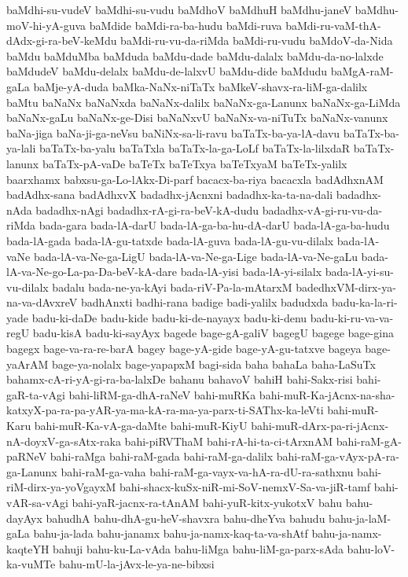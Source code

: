 {baMdhi-su-vudeV
baMdhi-su-vudu
baMdhoV
baMdhuH
baMdhu-janeV
baMdhu-moV-hi-yA-guva
baMdide
baMdi-ra-ba-hudu
baMdi-ruva
baMdi-ru-vaM-thA-dAdx-gi-ra-beV-keMdu
baMdi-ru-vu-da-riMda
baMdi-ru-vudu
baMdoV-da-Nida
baMdu
baMduMba
baMduda
baMdu-dade
baMdu-dalalx
baMdu-da-no-lalxde
baMdudeV
baMdu-delalx
baMdu-de-lalxvU
baMdu-dide
baMdudu
baMgA-raM-gaLa
baMje-yA-duda
baMka-NaNx-niTaTx
baMkeV-shavx-ra-liM-ga-dalilx
baMtu
baNaNx
baNaNxda
baNaNx-dalilx
baNaNx-ga-Lanunx
baNaNx-ga-LiMda
baNaNx-gaLu
baNaNx-ge-Disi
baNaNxvU
baNaNx-va-niTuTx
baNaNx-vanunx
baNa-jiga
baNa-ji-ga-neVsu
baNiNx-sa-li-ravu
baTaTx-ba-ya-lA-davu
baTaTx-ba-ya-lali
baTaTx-ba-yalu
baTaTxla
baTaTx-la-ga-LoLf
baTaTx-la-lilxdaR
baTaTx-lanunx
baTaTx-pA-vaDe
baTeTx
baTeTxya
baTeTxyaM
baTeTx-yalilx
baarxhamx
babxsu-ga-Lo-lAkx-Di-parf
bacacx-ba-riya
bacacxla
badAdhxnAM
badAdhx-sana
badAdhxvX
badadhx-jAcnxni
badadhx-ka-ta-na-dali
badadhx-nAda
badadhx-nAgi
badadhx-rA-gi-ra-beV-kA-dudu
badadhx-vA-gi-ru-vu-da-riMda
bada-gara
bada-lA-darU
bada-lA-ga-ba-hu-dA-darU
bada-lA-ga-ba-hudu
bada-lA-gada
bada-lA-gu-tatxde
bada-lA-guva
bada-lA-gu-vu-dilalx
bada-lA-vaNe
bada-lA-va-Ne-ga-LigU
bada-lA-va-Ne-ga-Lige
bada-lA-va-Ne-gaLu
bada-lA-va-Ne-go-La-pa-Da-beV-kA-dare
bada-lA-yisi
bada-lA-yi-silalx
bada-lA-yi-su-vu-dilalx
badalu
bada-ne-ya-kAyi
bada-riV-Pa-la-mAtarxM
badedhxVM-dirx-ya-na-va-dAvxreV
badhAnxti
badhi-rana
badige
badi-yalilx
badudxda
badu-ka-la-ri-yade
badu-ki-daDe
badu-kide
badu-ki-de-nayayx
badu-ki-denu
badu-ki-ru-va-va-regU
badu-kisA
badu-ki-sayAyx
bagede
bage-gA-galiV
bagegU
bagege
bage-gina
bagegx
bage-va-ra-re-barA
bagey
bage-yA-gide
bage-yA-gu-tatxve
bageya
bage-yaArAM
bage-ya-nolalx
bage-yapapxM
bagi-sida
baha
bahaLa
baha-LaSuTx
bahamx-cA-ri-yA-gi-ra-ba-lalxDe
bahanu
bahavoV
bahiH
bahi-Sakx-risi
bahi-gaR-ta-vAgi
bahi-liRM-ga-dhA-raNeV
bahi-muRKa
bahi-muR-Ka-jAcnx-na-sha-katxyX-pa-ra-pa-yAR-ya-ma-kA-ra-ma-ya-parx-ti-SAThx-ka-leVti
bahi-muR-Karu
bahi-muR-Ka-vA-ga-daMte
bahi-muR-KiyU
bahi-muR-dArx-pa-ri-jAcnx-nA-doyxV-ga-sAtx-raka
bahi-piRVThaM
bahi-rA-hi-ta-ci-tArxnAM
bahi-raM-gA-paRNeV
bahi-raMga
bahi-raM-gada
bahi-raM-ga-dalilx
bahi-raM-ga-vAyx-pA-ra-ga-Lanunx
bahi-raM-ga-vaha
bahi-raM-ga-vayx-va-hA-ra-dU-ra-sathxnu
bahi-riM-dirx-ya-yoVgayxM
bahi-shacx-kuSx-niR-mi-SoV-nemxV-Sa-va-jiR-tamf
bahi-vAR-sa-vAgi
bahi-yaR-jacnx-ra-tAnAM
bahi-yuR-kitx-yukotxV
bahu
bahu-dayAyx
bahudhA
bahu-dhA-gu-heV-shavxra
bahu-dheYva
bahudu
bahu-ja-laM-gaLa
bahu-ja-lada
bahu-janamx
bahu-ja-namx-kaq-ta-va-shAtf
bahu-ja-namx-kaqteYH
bahuji
bahu-ku-La-vAda
bahu-liMga
bahu-liM-ga-parx-sAda
bahu-loV-ka-vuMTe
bahu-mU-la-jAvx-le-ya-ne-bibxsi
}
